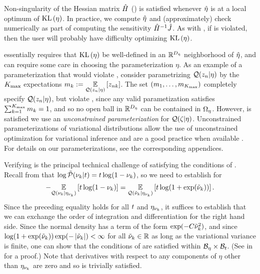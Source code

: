 Non-singularity of the Hessian matrix $\hat{H}$
() is satisfied whenever $\hat\eta$ is at a local
optimum of $\mathrm{KL}\left(\eta\right)$.  In practice, we compute $\hat\eta$ and (approximately)
check  numerically as part of computing the
sensitivity $\hat{H}^{-1} \hat J$.  As with
, if  is
violated, then the user will probably have difficulty optimizing $\mathrm{KL}\left(\eta\right)$.

 essentially requires that $\mathrm{KL}\left(\eta\right)$
be well-defined in an $\mathbb{R}^{D_{\eta}}$ neighborhood of $\hat\eta$, and can
require some care in choosing the parameterization $\eta$.  As an example of a
parameterization that would violate ,
consider parametrizing $\mathcal{Q}(z_{n} \vert \eta)$ by the ${K_{\mathrm{max}}}$ expectations
$m_k := \underset{\mathcal{Q}(z_{n} \vert \eta)}{\mathbb{E}}\left[z_{nk}\right]$.  The set $(m_1, \ldots,
m_{K_{\mathrm{max}}})$ completely specify $\mathcal{Q}(z_{n} \vert \eta)$, but violate
, since any valid parametization
satisfies $\sum_{k=1}^{K_{\mathrm{max}}} m_k = 1$, and so no open ball in
$\mathbb{R}^{D_{\eta}}$ can be contained in $\Omega_{\eta}$.  However,
 is satisfied we use an {\em
unconstrained parameterization} for $\mathcal{Q}(\zeta \vert \eta)$.   Unconstrained
parameterizations of variational distributions allow the use of unconstrained
optimization for variational inference and are a good practice when available
\citep{kucukelbir:2016:advi}.  For details on our parameterizations, see
the corresponding appendices.

Verifying  is the principal technical challenge of
satisfying the conditions of . Recall from
 that $\log \tilde{\mathcal{P}}(\nu_{k} \vert t) = t \log (1 - \nu_{k})$,
so we need to establish  for
%
\begin{align*}
%
-\expect{\q(\nuk \vert \etanuk)}{t \log (1 - \nuk)} =
\expect{\q(\lnuk \vert \etanuk)}
      {t \log (1 + \exp(\lnuk))}.
%
\end{align*}
%
Since the preceding equality holds for all $t$ and $\eta_{\nu_{k}}$, it suffices to
establish that we can exchange the order of integration and differentiation for
the right hand side.  Since the normal density has a term of the form
$\exp(-C \tilde{\nu}_{k}^2)$, and since $\log (1 + \exp(\tilde{\nu}_{k})) \exp(-\left|\tilde{\nu}_{k}\right|)  <
\infty$ for all $\tilde{\nu}_{k} \in \mathbb{R}$ as long as the variational variance is
finite, one can show that the conditions of  are
satisfied within $\mathcal{B}_\eta \times \mathcal{B}_t$.  (See
 in  for a proof.)
Note that
derivatives with respect to any components of $\eta$ other than $\eta_{\nu_{k}}$ are
zero and so  is trivially satisfied.

